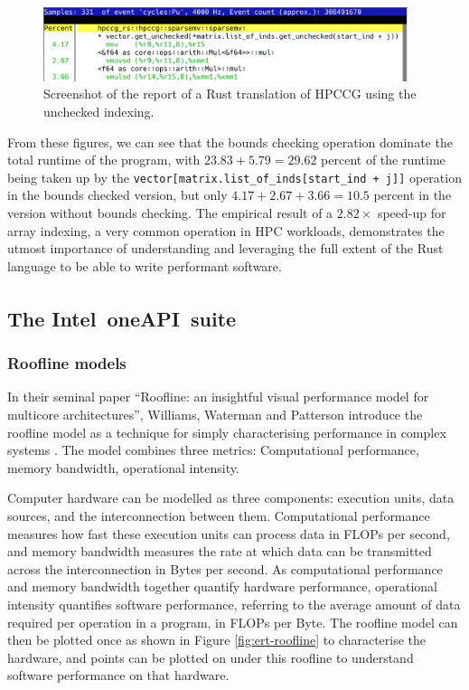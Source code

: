 \begin{figure}[H]
    \centering
    \includegraphics[width=0.95\textwidth]{images/5_performance/perf/perf_unchecked_op.png}
    \caption{Screenshot of the  report of a Rust translation of \acrshort{HPCCG} using the unchecked indexing.}
    \label{fig:perf-unchecked}
\end{figure}

From these figures, we can see that the bounds checking operation dominate the total runtime of the program, with $23.83 + 5.79 = 29.62$ percent of the runtime being taken up by the \texttt{vector[matrix.list_of_inds[start_ind + j]]} operation in the bounds checked version, but only $4.17 + 2.67 + 3.66 = 10.5$ percent in the version without bounds checking. The empirical result of a $2.82\times$ speed-up for array indexing, a very common operation in \acrshort{HPC} workloads, demonstrates the utmost importance of understanding and leveraging the full extent of the Rust language to be able to write performant software.

\subsection{The Intel\textsuperscript{\textregistered}\ oneAPI\texttrademark\ suite}
\label{ssec:intel-advisor-profiler}

\subsubsection{Roofline models}
\label{sssec:roofline-models}

In their seminal paper ``Roofline: an insightful visual performance model for multicore architectures'', Williams, Waterman and Patterson introduce the roofline model as a technique for simply characterising performance in complex systems \cite{williamsRooflineInsightfulVisual2009}. The model combines three metrics: Computational performance, memory bandwidth, operational intensity.

Computer hardware can be modelled as three components: execution units, data sources, and the interconnection between them. Computational performance measures how fast these execution units can process data in \acrfull{FLOPs} per second, and memory bandwidth measures the rate at which data can be transmitted across the interconnection in Bytes per second. As computational performance and memory bandwidth together quantify hardware performance, operational intensity quantifies software performance, referring to the average amount of data required per operation in a program, in \acrshort{FLOPs} per Byte. The roofline model can then be plotted once as shown in Figure \ref{fig:ert-roofline} to characterise the hardware, and points can be plotted on under this roofline to understand software performance on that hardware.

